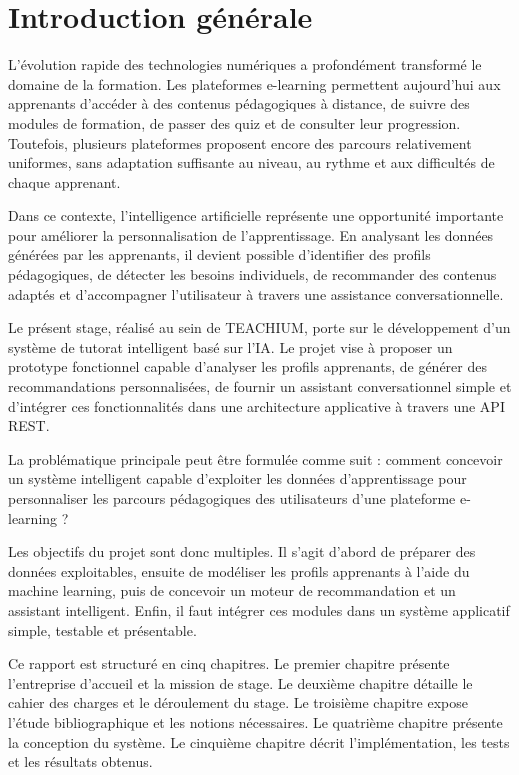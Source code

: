 \documentclass[12pt,a4paper]{report}
\begin{document}
\cleardoublepage
{}
\chapter*{Introduction générale}

L'évolution rapide des technologies numériques a profondément transformé le domaine de la formation. Les plateformes e-learning permettent aujourd'hui aux apprenants d'accéder à des contenus pédagogiques à distance, de suivre des modules de formation, de passer des quiz et de consulter leur progression. Toutefois, plusieurs plateformes proposent encore des parcours relativement uniformes, sans adaptation suffisante au niveau, au rythme et aux difficultés de chaque apprenant.

Dans ce contexte, l'intelligence artificielle représente une opportunité importante pour améliorer la personnalisation de l'apprentissage. En analysant les données générées par les apprenants, il devient possible d'identifier des profils pédagogiques, de détecter les besoins individuels, de recommander des contenus adaptés et d'accompagner l'utilisateur à travers une assistance conversationnelle.

Le présent stage, réalisé au sein de TEACHIUM, porte sur le développement d'un système de tutorat intelligent basé sur l'IA. Le projet vise à proposer un prototype fonctionnel capable d'analyser les profils apprenants, de générer des recommandations personnalisées, de fournir un assistant conversationnel simple et d'intégrer ces fonctionnalités dans une architecture applicative à travers une API REST.

La problématique principale peut être formulée comme suit : comment concevoir un système intelligent capable d'exploiter les données d'apprentissage pour personnaliser les parcours pédagogiques des utilisateurs d'une plateforme e-learning ?

Les objectifs du projet sont donc multiples. Il s'agit d'abord de préparer des données exploitables, ensuite de modéliser les profils apprenants à l'aide du machine learning, puis de concevoir un moteur de recommandation et un assistant intelligent. Enfin, il faut intégrer ces modules dans un système applicatif simple, testable et présentable.

Ce rapport est structuré en cinq chapitres. Le premier chapitre présente l'entreprise d'accueil et la mission de stage. Le deuxième chapitre détaille le cahier des charges et le déroulement du stage. Le troisième chapitre expose l'étude bibliographique et les notions nécessaires. Le quatrième chapitre présente la conception du système. Le cinquième chapitre décrit l'implémentation, les tests et les résultats obtenus.
\end{document}
